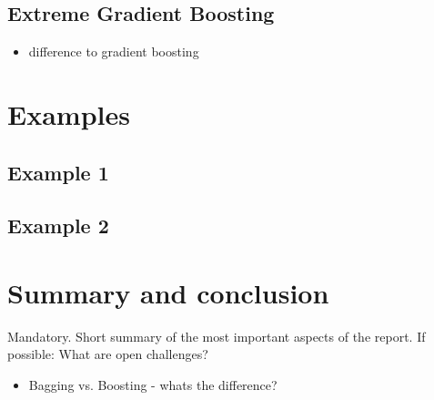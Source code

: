 \subsection{Extreme Gradient Boosting}
\begin{itemize}
    \item difference to gradient boosting
\end{itemize}


\section{Examples}
\subsection{Example 1}
\subsection{Example 2}

\section{Summary and conclusion}
Mandatory. Short summary of the most important aspects of the report.
If possible: What are open challenges?

\begin{itemize}
    \item Bagging vs. Boosting - whats the difference?
\end{itemize}

